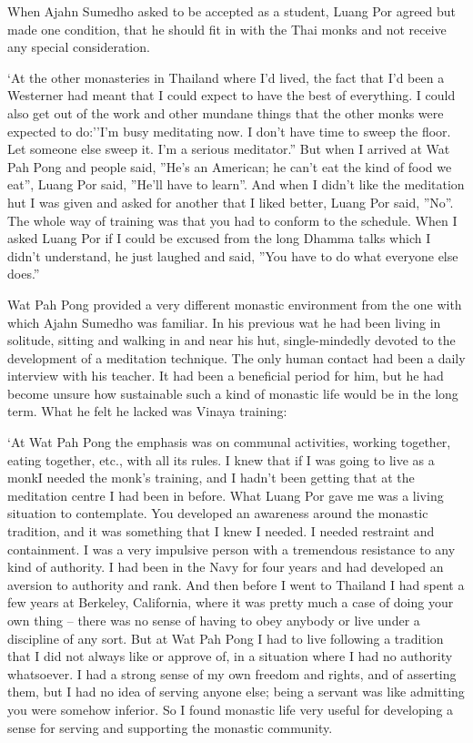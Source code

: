 When Ajahn Sumedho asked to be accepted as a student, Luang Por agreed
but made one condition, that he should fit in with the Thai monks and
not receive any special consideration.

`At the other monasteries in Thailand where I'd lived, the fact that I'd
been a Westerner had meant that I could expect to have the best of
everything. I could also get out of the work and other mundane things
that the other monks were expected to do:''I'm busy meditating now. I
don't have time to sweep the floor. Let someone else sweep it. I'm a
serious meditator.'' But when I arrived at Wat Pah Pong and people said,
''He's an American; he can't eat the kind of food we eat'', Luang Por
said, ''He'll have to learn''. And when I didn't like the meditation hut
I was given and asked for another that I liked better, Luang Por said,
''No''. The whole way of training was that you had to conform to the
schedule. When I asked Luang Por if I could be excused from the long
Dhamma talks which I didn't understand, he just laughed and said, ''You
have to do what everyone else does.''

Wat Pah Pong provided a very different monastic environment from the one
with which Ajahn Sumedho was familiar. In his previous wat he had been
living in solitude, sitting and walking in and near his hut,
single-mindedly devoted to the development of a meditation technique.
The only human contact had been a daily interview with his teacher. It
had been a beneficial period for him, but he had become unsure how
sustainable such a kind of monastic life would be in the long term. What
he felt he lacked was Vinaya training:

`At Wat Pah Pong the emphasis was on communal activities, working
together, eating together, etc., with all its rules. I knew that if I
was going to live as a monkI needed the monk's training, and I hadn't
been getting that at the meditation centre I had been in before. What
Luang Por gave me was a living situation to contemplate. You developed
an awareness around the monastic tradition, and it was something that I
knew I needed. I needed restraint and containment. I was a very
impulsive person with a tremendous resistance to any kind of authority.
I had been in the Navy for four years and had developed an aversion to
authority and rank. And then before I went to Thailand I had spent a few
years at Berkeley, California, where it was pretty much a case of doing
your own thing -- there was no sense of having to obey anybody or live
under a discipline of any sort. But at Wat Pah Pong I had to live
following a tradition that I did not always like or approve of, in a
situation where I had no authority whatsoever. I had a strong sense of
my own freedom and rights, and of asserting them, but I had no idea of
serving anyone else; being a servant was like admitting you were somehow
inferior. So I found monastic life very useful for developing a sense
for serving and supporting the monastic community.

